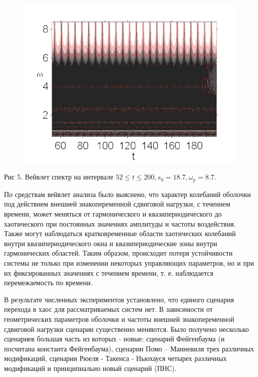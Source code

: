 \documentclass[12pt,letterpaper]{extreport}
\begin{document}
\begin{center}
\begin{figure}[H]
\centering
\includegraphics[scale=0.5]{ris5}
\end{figure}
Рис 5. Вейвлет спектр на интервале $52\leq t \leq 200, 
s_0=18.7, \omega_p = 8.7.$
\end{center}

\par По средствам вейвлет анализа было выяснено, что 
характер колебаний оболочки под действием внешней 
знакопеременной сдвиговой нагрузки, с течением времени, 
может меняться от гармонического и квазипериодического 
до хаотического при постоянных значениях амплитуды и 
частоты воздействия. Также могут наблюдаться 
кратковременные области хаотических колебаний внутри 
квазипериодического окна и квазипериодические зоны 
внутри гармонических областей. Таким образом, происходит 
потеря устойчивости системы не только при изменении 
некоторых управляющих параметров, но и при их 
фиксированных значениях с течением времени, т. е. 
наблюдается перемежаемость по времени.
\par В результате численных экспериментов установлено, 
что единого сценария перехода в хаос для рассматриваемых 
систем нет. В зависимости от геометрических параметров 
оболочки и частоты внешней знакопеременной сдвиговой 
нагрузки сценарии существенно меняются. Было получено 
несколько сценариев большая часть из которых - новые: 
сценарий Фейгенбаума (и посчитана константа 
Фейгенбаума), сценарии Помо – Манневиля трех различных 
модификаций, сценарии Рюеля - Такенса - Ньюхауся четырех 
различных модификаций и принципиально новый сценарий 
(ПНС).\\
\end{document}
